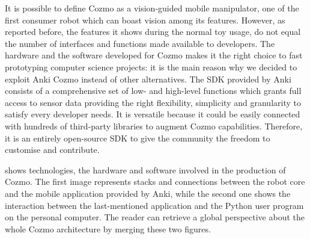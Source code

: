 It is possible to define Cozmo as a vision-guided mobile manipulator, one of the first consumer robot which can boast vision among its features. However, as reported before, the features it shows during the normal toy usage, do not equal the number of interfaces and functions made available to developers. The hardware and the software developed for Cozmo makes it the right choice to fast prototyping computer science projects: it is the main reason why we decided to exploit Anki Cozmo instead of other alternatives.
The SDK provided by Anki consists of a comprehensive set of low- and high-level functions which grants full access to sensor data providing the right flexibility, simplicity and granularity to satisfy every developer needs. It is versatile because it could be easily connected with hundreds of third-party libraries to augment Cozmo capabilities. Therefore, it is an entirely open-source SDK to give the community the freedom to customise and contribute.

 shows technologies, the hardware and software involved in the production of Cozmo. The first image represents stacks and connections between the robot core and the mobile application provided by Anki, while the second one shows the interaction between the last-mentioned application and the Python user program on the personal computer. The reader can retrieve a global perspective about the whole Cozmo architecture by merging these two figures.

